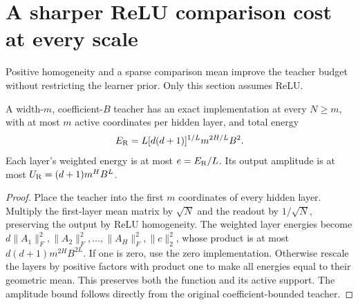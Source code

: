 \section{A sharper ReLU comparison cost at every scale}
\label{ag-sec:relu-selective}
Positive homogeneity and a sparse comparison mean improve the teacher budget without restricting the learner prior. Only this section assumes ReLU.

\begin{lemma}
\label{ag-lem:relu-balanced}
A width-$m$, coefficient-$B$ teacher has an exact implementation at every $N\ge m$, with at most $m$ active coordinates per hidden layer, and total energy
\[
 E_{\rm R}=L[d(d+1)]^{1/L}m^{2H/L}B^2.
\]
Each layer's weighted energy is at most $e=E_{\rm R}/L$. Its output amplitude is at most $U_{\rm R}=(d+1)m^HB^L$.
\end{lemma}
\begin{proof}
Place the teacher into the first $m$ coordinates of every hidden layer. Multiply the first-layer mean matrix by $\sqrt N$ and the readout by $1/\sqrt N$, preserving the output by ReLU homogeneity. The weighted layer energies become $d\|A_1\|_F^2,\|A_2\|_F^2,\ldots,\|A_H\|_F^2,\|c\|_2^2$, whose product is at most $d(d+1)m^{2H}B^{2L}$. If one is zero, use the zero implementation. Otherwise rescale the layers by positive factors with product one to make all energies equal to their geometric mean. This preserves both the function and its active support. The amplitude bound follows directly from the original coefficient-bounded teacher.
\end{proof}

